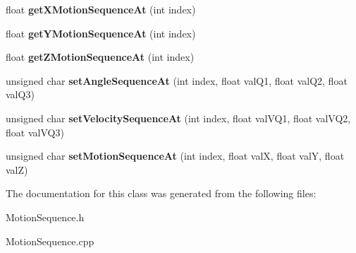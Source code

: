 \begin{DoxyCompactItemize}
float {\bfseries get\+X\+Motion\+Sequence\+At} (int index)
\item 
\mbox{\label{class_motion_sequence_a729ff79656c2ab6e4e9a2e60459d98da}} 
float {\bfseries get\+Y\+Motion\+Sequence\+At} (int index)
\item 
\mbox{\label{class_motion_sequence_a3311b61763e3718f6ed132a43d55d846}} 
float {\bfseries get\+Z\+Motion\+Sequence\+At} (int index)
\item 
\mbox{\label{class_motion_sequence_a27ff1becf72db7e18cede87ae531c612}} 
unsigned char {\bfseries set\+Angle\+Sequence\+At} (int index, float val\+Q1, float val\+Q2, float val\+Q3)
\item 
\mbox{\label{class_motion_sequence_a682065eef7969f3029ba6c813096f32c}} 
unsigned char {\bfseries set\+Velocity\+Sequence\+At} (int index, float val\+V\+Q1, float val\+V\+Q2, float val\+V\+Q3)
\item 
\mbox{\label{class_motion_sequence_adff7296e0da1e39a1986fae306a647f9}} 
unsigned char {\bfseries set\+Motion\+Sequence\+At} (int index, float valX, float valY, float valZ)
\end{DoxyCompactItemize}


The documentation for this class was generated from the following files\+:\begin{DoxyCompactItemize}
\item 
Motion\+Sequence.\+h\item 
Motion\+Sequence.\+cpp\end{DoxyCompactItemize}
